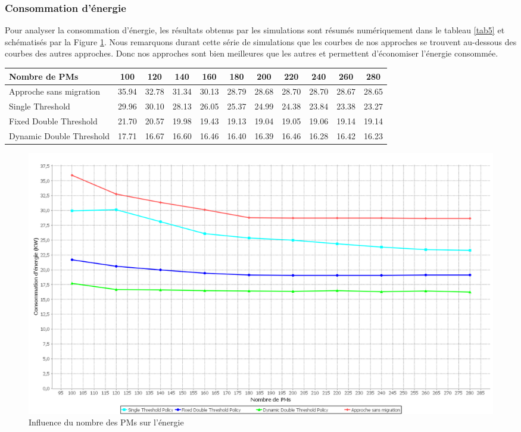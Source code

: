 \begin{onehalfspace}
\subsubsection{Consommation d’énergie}
Pour analyser la consommation d’énergie, les résultats obtenus par les simulations sont résumés numériquement dans le tableau \ref{tab5} et schématisés par la Figure \ref{InNVMEn1}. Nous remarquons durant cette série de simulations que les courbes de nos approches se trouvent au-dessous des courbes des autres approches. Donc nos approches sont bien meilleures que  les autres et permettent d’économiser l’énergie consommée.

\begin{center}
{\scriptsize   \begin{tabular}{|p{3.5cm}|c|c|c|c|c|c|c|c|c|c|}
\hline
      \centering     Nombre de PMs &  100& 120& 140& 160& 180& 200& 220& 240& 260& 280\\
\hline
     \centering       Approche sans migration &  35.94& 32.78& 31.34& 30.13& 28.79& 28.68& 28.70& 28.70& 28.67& 28.65\\
\hline
      \centering      Single Threshold &  29.96& 30.10& 28.13& 26.05& 25.37& 24.99& 24.38& 23.84& 23.38& 23.27\\
\hline
      \centering      Fixed Double Threshold &  21.70& 20.57& 19.98& 19.43& 19.13& 19.04& 19.05& 19.06& 19.14& 19.14\\
\hline
      \centering     Dynamic Double Threshold &  17.71& 16.67& 16.60& 16.46& 16.40& 16.39& 16.46& 16.28& 16.42& 16.23\\
\hline
\end{tabular}}
\label{tab5}
\end{center}


\begin{figure}[!h]
\begin{center}
\includegraphics[scale=0.35]{figures/sh4.png} 
\end{center}
\caption{Influence du nombre des PMs sur l’énergie}
\label{InNVMEn1}
\end{figure}


\end{onehalfspace}
